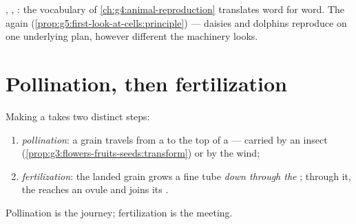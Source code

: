 \begin{remark}\label{rem:g5:flower-to-fruit:sameplan}
 , , : the vocabulary of
\cref{ch:g4:animal-reproduction} translates word for word.
The  again
(\cref{prop:g5:first-look-at-cells:principle}) --- daisies
and dolphins reproduce on one underlying plan, however
different the machinery looks.
\end{remark}

\section{Pollination, then fertilization}

\begin{definition}\label{def:g5:flower-to-fruit:steps}
Making a  takes two distinct steps:
\begin{enumerate}
  \item \emph{pollination}: a  grain
        travels from a  to the top of a  ---
        carried by an insect
        (\cref{prop:g3:flowers-fruits-seeds:transform}) or by
        the wind;
  \item \emph{fertilization}:
        the landed grain grows a fine tube \emph{down through
        the }; through it, the   reaches an
        ovule and joins its .
\end{enumerate}
Pollination is the journey; fertilization is the meeting.
\end{definition}

